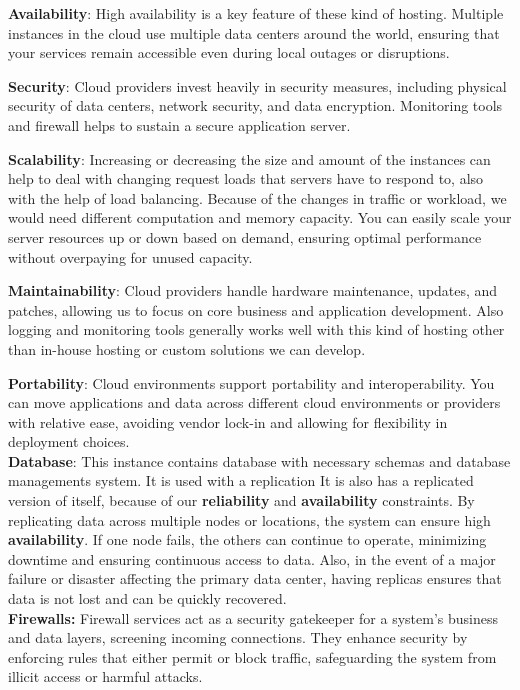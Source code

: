 \indent \textbf{Availability}: High availability is a key feature of these kind of hosting. Multiple instances in the cloud use multiple data centers around the world, ensuring that your services remain accessible even during local outages or disruptions.

\indent \textbf{Security}: Cloud providers invest heavily in security measures, including physical security of data centers, network security, and data encryption. Monitoring tools and firewall helps to sustain a secure application server.

\indent \textbf{Scalability}: Increasing or decreasing the size and amount of the instances can help to deal with changing request loads that servers have to respond to, also with the help of load balancing. Because of the changes in traffic or workload, we would need different computation and memory capacity. You can easily scale your server resources up or down based on demand, ensuring optimal performance without overpaying for unused capacity.

\indent \textbf{Maintainability}: Cloud providers handle hardware maintenance, updates, and patches, allowing us to focus on core business and application development. Also logging and monitoring tools generally works well with this kind of hosting other than in-house hosting or custom solutions we can develop.

\indent \textbf{Portability}: Cloud environments support portability and interoperability. You can move applications and data across different cloud environments or providers with relative ease, avoiding vendor lock-in and allowing for flexibility in deployment choices.
\\
\indent \textbf{Database}: This instance contains database with necessary schemas and database managements system. It is used with a replication It is also has a replicated version of itself, because of our \textbf{reliability} and \textbf{availability} constraints. By replicating data across multiple nodes or locations, the system can ensure high \textbf{availability}. If one node fails, the others can continue to operate, minimizing downtime and ensuring continuous access to data. Also, in the event of a major failure or disaster affecting the primary data center, having replicas ensures that data is not lost and can be quickly recovered. 
\\
\indent \textbf{Firewalls:} Firewall services act as a security gatekeeper for a system's business and data layers, screening incoming connections. They enhance security by enforcing rules that either permit or block traffic, safeguarding the system from illicit access or harmful attacks.

